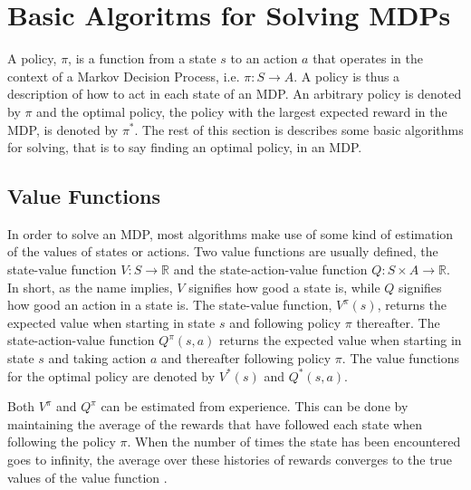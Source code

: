 \section{Basic Algoritms for Solving MDPs }

A policy, $\pi$, is a function from a state $s$ to an action $a$ that operates in the context of a Markov Decision Process, i.e. $\pi \colon S \to A$. A policy is thus a description of how to act in each state of an MDP. An arbitrary policy is denoted by $\pi$ and the optimal policy, the policy with the largest expected reward in the MDP, is denoted by $\pi^*$. The rest of this section is describes some basic algorithms for solving, that is to say finding an optimal policy, in an MDP.


\subsection{Value Functions }

In order to solve an MDP, most algorithms make use of some kind of estimation of the values of states or actions. Two value functions are usually defined, the state-value function $V : S \to \mathbb R$ and the state-action-value function $Q : S \times A \to \mathbb R$. In short, as the name implies, $V$ signifies how good a state is, while $Q$ signifies how good an action in a state is. The state-value function, $V^\pi(s)$, returns the expected value when starting in state $s$ and following policy $\pi$ thereafter. The state-action-value function $Q^\pi(s, a)$ returns the expected value when starting in state $s$ and taking action $a$ and thereafter following policy $\pi$. The value functions for the optimal policy are denoted by $V^*(s)$ and $Q^*(s, a)$. 

Both $V^\pi$ and $Q^\pi$ can be estimated from experience. This can be done by maintaining the average of the rewards that have followed each state when following the policy $\pi$. When the number of times the state has been encountered goes to infinity, the average over these histories of rewards converges to the true values of the value function \parencite{barto1998reinforcement}.





